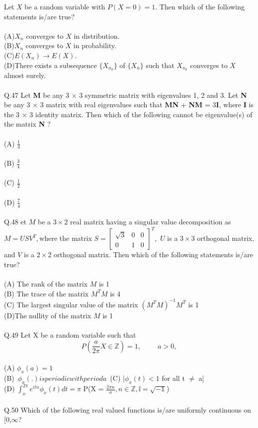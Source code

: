 \documentclass{book}[200pt]
\begin{document}
{Let \(X\) be a random variable with \(P(X=0)=1\). Then which of the following statements is/are true?\\
\\
(A)\(X_n\) converges to \(X\) in distribution.\\
(B)\(X_n\) converges to \(X\) in probability.\\
(C)\(E(X_n) \longrightarrow E(X)\).\\
(D)There exists a subsequence \(\{X_{n_k}\}\) of \(\{X_n\}\) such that \(X_{n_k}\) converges to \(X\) almost surely.\\
\\
Q.47 Let  \textbf{M} be any 3 × 3 symmetric matrix with eigenvalues 1, 2 and 3. Let \textbf{N} be any
3 × 3 matrix with real eigenvalues such that \textbf{MN} + \textbf{NM} = 3\textbf{I}, where \textbf{I} is the
3 × 3 identity matrix. Then which of the following cannot be eigenvalue(s) of the
matrix \textbf{N} ?\\
\\
(A) $\frac{1}{4}$  \\
\\
(B) $\frac{3}{4}$\\
\\
(C) $\frac{1}{2}$\\
\\
(D) $\frac{7}{4}$\\
\\
Q.48 et \(M\) be a \(3 \times 2\) real matrix having a singular value decomposition as $M = USV^T,$where the matrix $
S = \begin{bmatrix}
	\sqrt{3} & 0 & 0 \\
	0 & 1 & 0
\end{bmatrix}^T,
$
\(U\) is a \(3 \times 3\) orthogonal matrix, and \(V\) is a \(2 \times 2\) orthogonal matrix. Then which of the following statements is/are true?\\
\\
(A) The rank of the matrix \(M\) is 1 \\
(B) The trace of the matrix \(M^TM\) is 4\\
(C) The largest singular value of the matrix \((M^TM)^{-1}\)$M^T$ is 1 \\
(D)The nullity of the matrix \(M\) is 1 \\
\\
Q.49 Let X be a random variable such that \[
P(\frac{a}{2\pi}X \in \mathbb{Z}) = 1, \hspace{1cm} a > 0,
\]\\
(A) $\phi_x(a) = 1$\\
(B)\ $\phi_x(.) is periodic with period a$\
(C) |$\phi_x(t) < 1$ for all t $\neq$ a|\\
(D) $\int_{o}^{2\pi}e^{itn}\phi_x(t)dt = \pi $ P(X = $\frac{2\pi n}{a},n \in \mathbb{Z, i = \sqrt{-1}}$)\\
\\
Q.50 Which of the following real valued functions is/are uniformly continuous on [0,$\infty$}?\\
\end{document}
